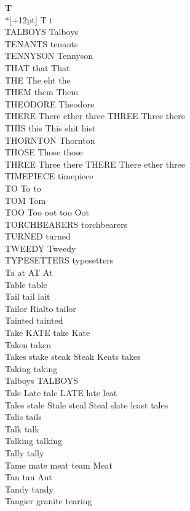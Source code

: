 \vspace{14pt}
\noindent\textbf{\Large T}\\*[+12pt]
T t\\
TALBOYS Talboys\\
TENANTS tenants\\
TENNYSON Tennyson\\
THAT that That\\
THE The eht the\\
THEM them Them\\
THEODORE Theodore\\
THERE There ether three THREE Three there\\
THIS this This shit hist\\
THORNTON Thornton\\
THOSE Those those\\
THREE Three there THERE There ether three\\
TIMEPIECE timepiece\\
TO To to\\
TOM Tom\\
TOO Too oot too Oot\\
TORCHBEARERS torchbearers\\
TURNED turned\\
TWEEDY Tweedy\\
TYPESETTERS typesetters\\
Ta at AT At\\
Table table\\
Tail tail lait\\
Tailor Rialto tailor\\
Tainted tainted\\
Take KATE take Kate\\
Taken taken\\
Takes stake steak Steak Keats takes\\
Taking taking\\
Talboys TALBOYS\\
Tale Late tale LATE late leat\\
Tales stale Stale steal Steal slate least tales\\
Talis tails\\
Talk talk\\
Talking talking\\
Tally tally\\
Tame mate meat team Meat\\
Tan tan Ant\\
Tandy tandy\\
Tangier granite tearing\\
